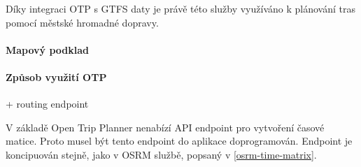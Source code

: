 \documentclass[thesis=M,czech]{FITthesis}[2019/12/23]
\theoremstyle{plain}
\theoremstyle{definition}
\begin{document}
Díky integraci OTP s GTFS daty je právě této služby využíváno k plánování tras pomocí městské hromadné dopravy.




\paragraph{Mapový podklad}



\paragraph{Způsob využití OTP}


+ routing endpoint


V základě Open Trip Planner nenabízí API endpoint pro vytvoření časové matice\cite{otp-api-spec}. Proto musel být tento endpoint do aplikace doprogramován. Endpoint je koncipuován stejně, jako v OSRM službě, popsaný v \ref{osrm-time-matrix}.






\end{document}
